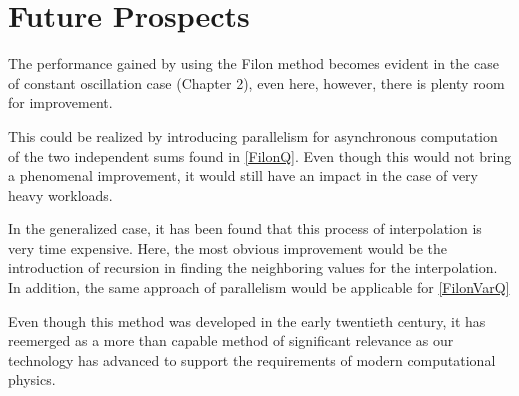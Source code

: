 \vspace{0.1in}

\section{Future Prospects}

The performance gained by using the Filon method becomes evident in the case of constant oscillation case (Chapter 2),
even here, however, there is plenty room for improvement.

This could be realized by introducing parallelism for asynchronous computation of the two independent sums
found in \eqref{FilonQ}. Even though this would not bring a phenomenal improvement, it would still have an impact
in the case of very heavy workloads.

\vspace{0.1in}


In the generalized case, it has been found that this process of interpolation is very
time expensive. Here, the most obvious improvement would be the introduction of recursion in finding the
neighboring values for the interpolation. In addition, the same approach of parallelism
would be applicable for \eqref{FilonVarQ} 

\vspace{0.1in}

Even though this method was developed in the early twentieth century, 
it has reemerged as a more than capable method of significant relevance as our technology
has advanced to support the requirements of modern computational physics.
